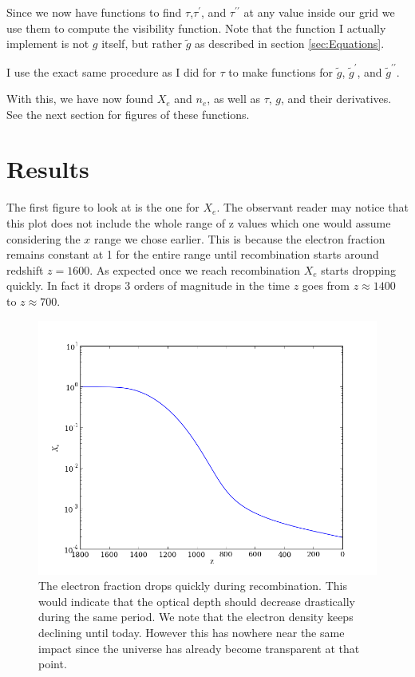 \documentclass{aa}   %
\begin{document}
Since we now have functions to find $\tau$,$\tau^\prime$, and $\tau^{\prime\prime}$ at any value inside our grid we use them to compute the visibility function. Note that the function I actually implement is not $g$ itself, but rather $\tilde{g}$ as described in section \ref{sec:Equations}.

I use the exact same procedure as I did for $\tau$ to make functions for $\tilde{g}$, $\tilde{g}^\prime$, and $\tilde{g}^{\prime\prime}$.

With this, we have now found $X_e$ and $n_e$, as well as  $\tau$, $g$, and their derivatives. See the next section for figures of these functions.
\section{Results}\label{sec:results}

The first figure to look at is the one for $X_e$. The observant reader may notice that this plot does not include the whole range of z values which one would assume considering the $x$ range we chose earlier. This is because the electron fraction remains constant at 1 for the entire range until recombination starts around redshift $z = 1600$. As expected once we reach recombination $X_e$ starts dropping quickly. In fact it drops 3 orders of magnitude in the time $z$ goes from $z \approx 1400$ to $z \approx 700$.

  \begin{figure}[ht]
   \includegraphics[width=.49\textwidth]{X_e.png}
   \caption{The electron fraction drops quickly during recombination. This would indicate that the optical depth should decrease drastically during the same period. We note that the electron density keeps declining until today. However this has nowhere near the same impact since the universe has already become transparent at that point.}
   \label{fig:X_e}
  \end{figure}
\end{document}
